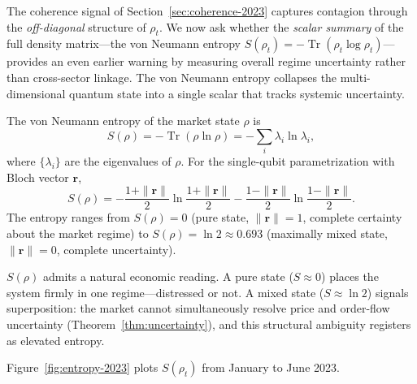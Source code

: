 The coherence signal of Section~\ref{sec:coherence-2023} captures contagion through
the \emph{off-diagonal} structure of $\rho_t$. We now ask whether the \emph{scalar
summary} of the full density matrix---the von Neumann entropy $S(\rho_t) =
-\operatorname{Tr}(\rho_t \log \rho_t)$---provides an even earlier warning by
measuring overall regime uncertainty rather than cross-sector linkage.
The von Neumann entropy collapses the multi-dimensional quantum state into a
single scalar that tracks systemic uncertainty.

\begin{definition}\label{def:vn-entropy}
The von Neumann entropy of the market state $\rho$ is
\begin{equation}\label{eq:vn-entropy}
    S(\rho) = -\operatorname{Tr}(\rho \ln \rho) = -\sum_i \lambda_i \ln \lambda_i,
\end{equation}
where $\{\lambda_i\}$ are the eigenvalues of $\rho$. For the single-qubit
parametrization with Bloch vector $\mathbf{r}$,
\begin{equation*}
    S(\rho) = -\frac{1+\|\mathbf{r}\|}{2} \ln \frac{1+\|\mathbf{r}\|}{2}
    - \frac{1-\|\mathbf{r}\|}{2} \ln \frac{1-\|\mathbf{r}\|}{2}.
\end{equation*}
The entropy ranges from $S(\rho) = 0$ (pure state, $\|\mathbf{r}\| = 1$, complete
certainty about the market regime) to $S(\rho) = \ln 2 \approx 0.693$ (maximally
mixed state, $\|\mathbf{r}\| = 0$, complete uncertainty).
\end{definition}

$S(\rho)$ admits a natural economic reading. A pure state ($S \approx 0$) places
the system firmly in one regime---distressed or not. A mixed state
($S \approx \ln 2$) signals superposition: the market cannot simultaneously
resolve price and order-flow uncertainty (Theorem~\ref{thm:uncertainty}), and this
structural ambiguity registers as elevated entropy.

Figure~\ref{fig:entropy-2023} plots $S(\rho_t)$ from January to June 2023.

